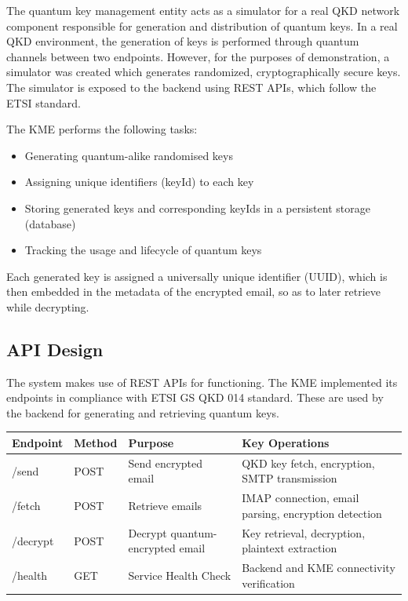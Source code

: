 \documentclass[conference]{IEEEtran}
\begin{document}
The quantum key management entity acts as a simulator for a real QKD network component responsible for generation and distribution of quantum keys. In a real QKD environment, the generation of keys is performed through quantum channels between two endpoints. However, for the purposes of demonstration, a simulator was created which generates randomized, cryptographically secure keys. The simulator is exposed to the backend using REST APIs, which follow the ETSI standard.

The KME performs the following tasks:
\begin{itemize}
\item
  Generating quantum-alike randomised keys
\item
  Assigning unique identifiers (keyId) to each key
\item
  Storing generated keys and corresponding keyIds in a persistent  storage (database)
\item
  Tracking the usage and lifecycle of quantum keys
\end{itemize}

Each generated key is assigned a universally unique identifier (UUID), which is then embedded in the metadata of the encrypted email, so as to later retrieve while decrypting.

\subsection{API Design}

The system makes use of REST APIs for functioning.
The KME implemented its endpoints in compliance with ETSI GS QKD 014 standard. These are used by the backend for generating and retrieving quantum keys.

\begin{center}
\begin{tabular}{|p{1.5cm}|p{2cm}|p{2cm}|p{2cm}|}
\hline
\textbf{Endpoint} & \textbf{Method} & \textbf{Purpose} & \textbf{Key Operations} \\ 
\hline
/send & POST & Send encrypted email & QKD key fetch, encryption, SMTP transmission \\ 
\hline
/fetch & POST & Retrieve emails & IMAP connection, email parsing, encryption detection \\ 
\hline
/decrypt & POST & Decrypt quantum-encrypted email & Key retrieval, decryption, plaintext extraction \\ 
\hline
/health & GET & Service Health Check & Backend and KME connectivity verification \\ 
\hline
\end{tabular}
\end{center}
\end{document}
